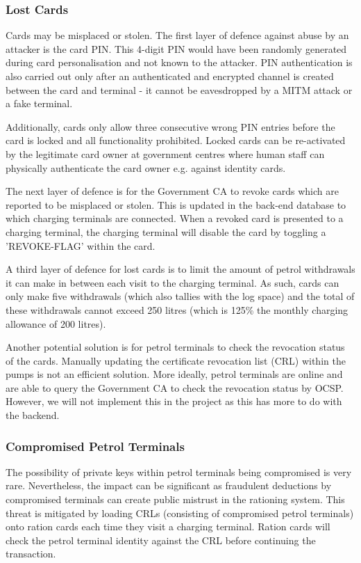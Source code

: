 \subsubsection{Lost Cards}
Cards may be misplaced or stolen. The first layer of defence against abuse by an attacker is the card PIN. This 4-digit PIN would have been randomly generated during card personalisation and not known to the attacker. PIN authentication is also carried out only after an authenticated and encrypted channel is created between the card and terminal - it cannot be eavesdropped by a MITM attack or a fake terminal. 

Additionally, cards only allow three consecutive wrong PIN entries before the card is locked and all functionality prohibited. Locked cards can be re-activated by the legitimate card owner at government centres where human staff can physically authenticate the card owner e.g. against identity cards.

The next layer of defence is for the Government CA to revoke cards which are reported to be misplaced or stolen. This is updated in the back-end database to which charging terminals are connected. When a revoked card is presented to a charging terminal, the charging terminal will disable the card by toggling a 'REVOKE-FLAG' within the card.

A third layer of defence for lost cards is to limit the amount of petrol withdrawals it can make in between each visit to the charging terminal. As such, cards can only make five withdrawals (which also tallies with the log space) and the total of these withdrawals cannot exceed 250 litres (which is 125\% the monthly charging allowance of 200 litres).

Another potential solution is for petrol terminals to check the revocation status of the cards. Manually updating the certificate revocation list (CRL) within the pumps is not an efficient solution. More ideally, petrol terminals are online and are able to query the Government CA to check the revocation status by OCSP. However, we will not implement this in the project as this has more to do with the backend.

\subsubsection{Compromised Petrol Terminals}
The possibility of private keys within petrol terminals being compromised is very rare. Nevertheless, the impact can be significant as fraudulent deductions by compromised terminals can create public mistrust in the rationing system. This threat is mitigated by loading CRLs (consisting of compromised petrol terminals) onto ration cards each time they visit a charging terminal. Ration cards will check the petrol terminal identity against the CRL before continuing the transaction.